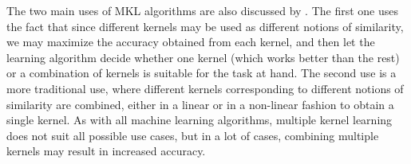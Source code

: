 The two main uses of MKL algorithms are also discussed by \cite{gonen11a}. The first one uses the fact that since different kernels may be used as different notions of similarity, we may maximize the accuracy obtained from each kernel, and then let the learning algorithm decide whether one kernel (which works better than the rest) or a combination of kernels is suitable for the task at hand. The second use is a more traditional use, where different kernels corresponding to different notions of similarity are combined, either in a linear or in a non-linear fashion to obtain a single kernel. As with all machine learning algorithms, multiple kernel learning does not suit all possible use cases, but in a lot of cases, combining multiple kernels may result in increased accuracy.
